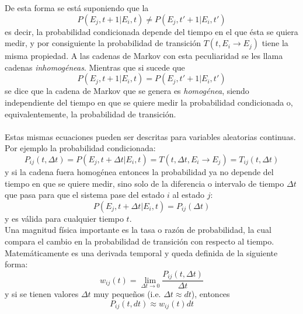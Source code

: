 \documentclass[12pt]{book}
\begin{document}
De esta forma se está suponiendo que la 
\begin{equation}
	P(E_{j},t+1 | E_{i}, t) \neq P(E_{j},t'+1 | E_{i}, t')
\end{equation}
es decir, la probabilidad condicionada depende del tiempo en el que ésta se quiera medir, y por consiguiente la probabilidad de transición $T(t, E_{i}\rightarrow E_{j})$ tiene la misma propiedad. A las cadenas de Markov con esta peculiaridad se les llama cadenas \textit{inhomogéneas}. Mientras que si sucede que 
\begin{equation}
	P(E_{j},t+1 | E_{i}, t)=P(E_{j},t'+1 | E_{i}, t')
\end{equation}
se dice que la cadena de Markov que se genera es \textit{homogénea}, siendo independiente del tiempo en que se quiere medir la probabilidad condicionada o, equivalentemente, la probabilidad de transición.
\\
\\
Estas mismas ecuaciones pueden ser descritas para variables aleatorias continuas. Por ejemplo la probabilidad condicionada:
\begin{equation}
	P_{ij}(t, \Delta t)=P(E_{j},t+\Delta t | E_{i}, t) = T(t,\Delta t, E_{i}\rightarrow E_{j})=T_{ij}(t, \Delta t)
\end{equation}
y si la cadena fuera homogénea entonces la probabilidad ya no depende del tiempo en que se quiere medir, sino solo de la diferencia o intervalo de tiempo $\Delta t$ que pasa para que el sistema pase del estado $i$ al estado $j$:
\begin{equation}
	P(E_{j},t+\Delta t | E_{i}, t) = P_{ij}(\Delta t) 
\end{equation}
y es válida para cualquier tiempo $t$.
\\

Una magnitud física importante es la tasa o razón de probabilidad, la cual compara el cambio en la probabilidad de transición con respecto al tiempo. Matemáticamente es una derivada temporal y queda definida de la siguiente forma:
\begin{equation}
w_{ij}(t) = \lim_{\Delta t \rightarrow 0}\frac{P_{ij}(t,\Delta t)}{\Delta t}  \label{aprox}
\end{equation}
y si se tienen valores $\Delta t$ muy pequeños (i.e. $\Delta t \approx dt$), entonces
\begin{equation}
	P_{ij}(t,dt) \approx w_{ij}(t) dt 
\end{equation}
\end{document}
